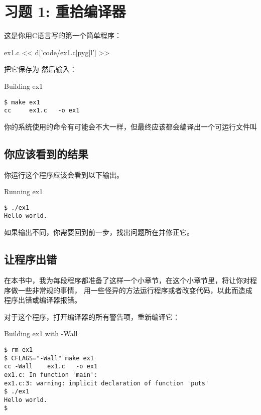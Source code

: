 \chapter{习题 1: 重拾编译器}

这是你用C语言写的第一个简单程序：

\begin{code}{ex1.c}
<< d['code/ex1.c|pyg|l'] >>
\end{code}

把它保存为  然后输入：

\begin{Terminal}{Building ex1}
\begin{lstlisting}
$ make ex1
cc     ex1.c   -o ex1
\end{lstlisting}
\end{Terminal}

你的系统使用的命令有可能会不大一样，但最终应该都会编译出一个可运行文件叫 

\section{你应该看到的结果}

你运行这个程序应该会看到以下输出。

\begin{Terminal}{Running ex1}
\begin{lstlisting}
$ ./ex1
Hello world.
\end{lstlisting}
\end{Terminal}

如果输出不同，你需要回到前一步，找出问题所在并修正它。

\section{让程序出错}

在本书中，我为每段程序都准备了这样一个小章节，在这个小章节里，将让你对程序做一些非常规的事情，
用一些怪异的方法运行程序或者改变代码，以此而造成程序出错或编译器报错。

对于这个程序，打开编译器的所有警告项，重新编译它：

\begin{Terminal}{Building ex1 with -Wall}
\begin{lstlisting}
$ rm ex1
$ CFLAGS="-Wall" make ex1
cc -Wall    ex1.c   -o ex1
ex1.c: In function 'main':
ex1.c:3: warning: implicit declaration of function 'puts'
$ ./ex1
Hello world.
$ 
\end{lstlisting}
\end{Terminal}


